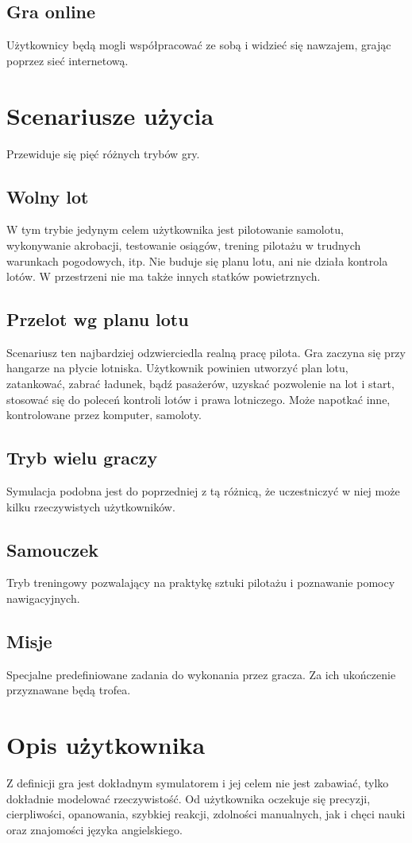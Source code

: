 \documentclass{mwrep}
\begin{document}
\subsection{Gra online}
Użytkownicy będą mogli współpracować ze sobą i widzieć się nawzajem, grając poprzez sieć internetową.

\section{Scenariusze użycia}
Przewiduje się pięć różnych trybów gry.
\subsection{Wolny lot}
W tym trybie jedynym celem użytkownika jest pilotowanie samolotu, wykonywanie akrobacji, testowanie osiągów, trening pilotażu w trudnych warunkach pogodowych, itp. Nie buduje się planu lotu, ani nie działa kontrola lotów. W przestrzeni nie ma także innych statków powietrznych.
\subsection{Przelot wg planu lotu}
Scenariusz ten najbardziej odzwierciedla realną pracę pilota. Gra zaczyna się przy hangarze na płycie lotniska. Użytkownik powinien utworzyć plan lotu, zatankować, zabrać ładunek, bądź pasażerów, uzyskać pozwolenie na lot i start, stosować się do poleceń kontroli lotów i prawa lotniczego. Może napotkać inne, kontrolowane przez komputer, samoloty.
\subsection{Tryb wielu graczy}
Symulacja podobna jest do poprzedniej z tą różnicą, że uczestniczyć w niej może kilku rzeczywistych użytkowników.
\subsection{Samouczek}
Tryb treningowy pozwalający na praktykę sztuki pilotażu i poznawanie pomocy nawigacyjnych.
\subsection{Misje}
Specjalne predefiniowane zadania do wykonania przez gracza. Za ich ukończenie przyznawane będą trofea.

\section{Opis użytkownika}
Z definicji gra jest dokładnym symulatorem i jej celem nie jest zabawiać, tylko dokładnie modelować rzeczywistość. Od użytkownika oczekuje się precyzji, cierpliwości, opanowania, szybkiej reakcji, zdolności manualnych, jak i chęci nauki oraz znajomości języka angielskiego.
\end{document}
